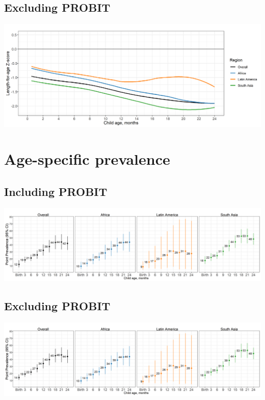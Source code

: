 \documentclass[9pt,]{book}
\begin{document}
\hypertarget{excluding-probit}{%
\subsection{Excluding PROBIT}\label{excluding-probit}}

\includegraphics[width=41.67in]{figure-copies/fig-laz-2-mean-overall_region--allage-primary_no_probit}

\hypertarget{age-specific-prevalence-1}{%
\section{Age-specific prevalence}\label{age-specific-prevalence-1}}

\hypertarget{including-probit-1}{%
\subsection{Including PROBIT}\label{including-probit-1}}

\includegraphics[width=58.33in]{figure-copies/fig-stunt-2-prev-overall_region--allage-primary}

\hypertarget{excluding-probit-1}{%
\subsection{Excluding PROBIT}\label{excluding-probit-1}}

\includegraphics[width=58.33in]{figure-copies/fig-stunt-2-prev-overall_region--allage-primary_no_probit}
\end{document}
